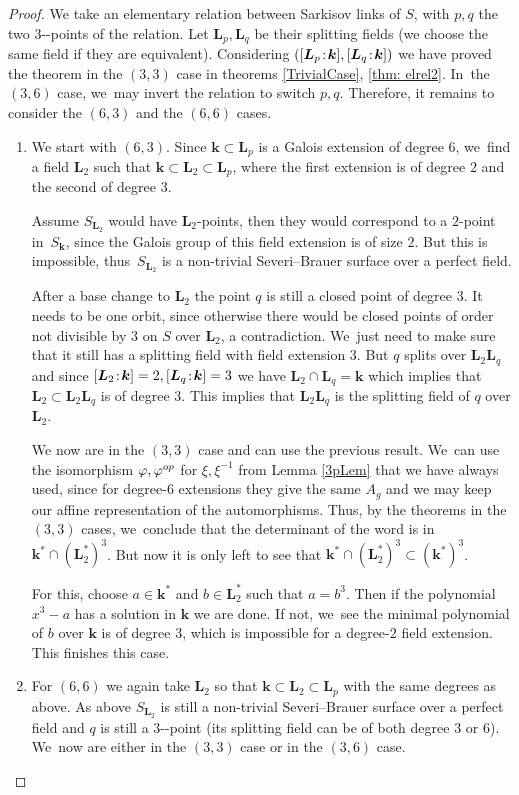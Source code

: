 \documentclass[10pt,a4paper]{amsart}
\providecommand{\nobreakdash}{\nobreak\hbox{-}}
\newcommand{\op}{\textup{op}}
\newcommand{\sep}{\mkern2mu{:}\mkern2mu}
\theoremstyle{definition}
\newcommand{\kk}{{\boldsymbol{k}}}
\newcommand{\LL}{{\boldsymbol{L}}}
\begin{document}
\begin{proof}
We take an elementary relation between Sarkisov links of $S$, with $p,q$ the two $3$\nobreakdash-points of the relation. Let $\LL_p, \LL_q$ be their splitting fields (we choose the same field if they are equivalent). Considering $([\LL_p\sep \kk], [\LL_q\sep \kk])$ we have proved the theorem in the $(3,3)$ case in theorems \ref{TrivialCase}, \ref{thm: elrel2}. In~the $(3,6)$ case, we~may invert the relation to switch $p,q$. Therefore, it remains to consider the $(6,3)$ and the $(6,6)$ cases.
\begin{enumerate}
\item We start with $(6,3)$. Since $\kk \subset \LL_p$ is a Galois extension of degree $6$, we~find a field $\LL_2$ such that $\kk \subset \LL_2 \subset \LL_p$, where the first extension is of degree $2$ and the second of degree $3$.

Assume $S_{\LL_2}$ would have $\LL_2$-points, then they would correspond to a $2$-point in~$S_{\kk}$, since the Galois group of this field extension is of size $2$. But this is impossible, thus~$S_{\LL_2}$ is a non-trivial Severi--Brauer surface over a perfect field.

After a base change to $\LL_2$ the point $q$ is still a closed point of degree $3$. It needs to be one orbit, since otherwise there would be closed points of order not divisible by $3$ on $S$ over $\LL_2$, a contradiction. We~just need to make sure that it still has a splitting field with field extension $3$. But $q$ splits over $\LL_2 \LL_q$ and since $[\LL_2\sep  \kk] = 2, [\LL_q\sep  \kk] = 3$ we have $\LL_2 \cap \LL_q = \kk$ which implies that $\LL_2 \subset \LL_2 \LL_q$ is of degree $3$. This implies that $\LL_2\LL_q$ is the splitting field of $q$ over $\LL_2$.

We now are in the $(3,3)$ case and can use the previous result. We~can use the isomorphism $\varphi, \varphi^{\op}$ for $\xi,\xi^{-1}$ from Lemma \ref{3pLem} that we have always used, since for degree-$6$ extensions they give the same $A_g$ and we may keep our affine representation of the automorphisms. Thus, by the theorems in the $(3,3)$ cases, we~conclude that the determinant of the word is in $\kk^* \cap (\LL_2^{*})^3$. But now it is only left to see that \hbox{$\kk^* \cap (\LL_2^{*})^3 \subset (\kk^{*})^3$}.

For this, choose $a \in \kk^*$ and $b \in \LL_2^*$ such that $a = b^3$. Then if the polynomial $x^3 - a$ has a solution in $\kk$ we are done. If not, we~see the minimal polynomial of $b$ over $\kk$ is of degree $3$, which is impossible for a degree-$2$ field extension. This finishes this case.
\item For $(6,6)$ we again take $\LL_2$ so that $\kk \subset \LL_2 \subset \LL_p$ with the same degrees as above. As above $S_{\LL_2}$ is still a non-trivial Severi--Brauer surface over a perfect field and $q$ is still a $3$\nobreakdash-point (its splitting field can be of both degree $3$ or $6$). We~now are either in the $(3,3)$ case or in the $(3,6)$ case.


\end{enumerate}
\end{proof}
\end{document}
